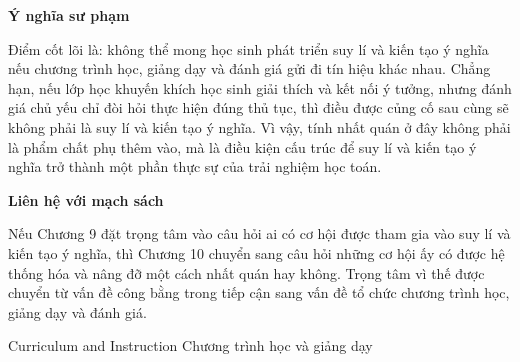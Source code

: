 {{    \textbf{Ý nghĩa sư phạm}\par\vspace*{\baselineskip}

    Điểm cốt lõi là: không thể mong học sinh phát triển suy lí và kiến tạo ý nghĩa nếu chương trình học, giảng dạy và đánh giá gửi đi tín hiệu khác nhau. Chẳng hạn, nếu lớp học khuyến khích học sinh giải thích và kết nối ý tưởng, nhưng đánh giá chủ yếu chỉ đòi hỏi thực hiện đúng thủ tục, thì điều được củng cố sau cùng sẽ không phải là suy lí và kiến tạo ý nghĩa. Vì vậy, tính nhất quán ở đây không phải là phẩm chất phụ thêm vào, mà là điều kiện cấu trúc để suy lí và kiến tạo ý nghĩa trở thành một phần thực sự của trải nghiệm học toán.\par\vspace*{\baselineskip}

    \textbf{Liên hệ với mạch sách}\par\vspace*{\baselineskip}

    Nếu Chương 9 đặt trọng tâm vào câu hỏi ai có cơ hội được tham gia vào suy lí và kiến tạo ý nghĩa, thì Chương 10 chuyển sang câu hỏi những cơ hội ấy có được hệ thống hóa và nâng đỡ một cách nhất quán hay không. Trọng tâm vì thế được chuyển từ vấn đề công bằng trong tiếp cận sang vấn đề tổ chức chương trình học, giảng dạy và đánh giá.}
  }

\TriPara
  {
  }
  {
  }{\NOTE{}}

\ParallelSection
  {Curriculum and Instruction}
  {Chương trình học và giảng dạy}
  {}

